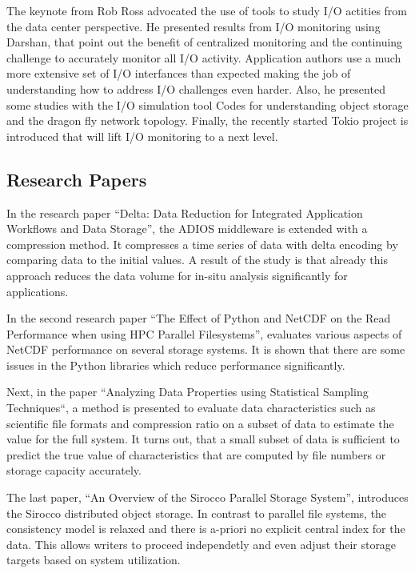 \documentclass{llncs}
\begin{document}
The keynote from Rob Ross advocated the use of tools to study I/O actities from the data center perspective.
He presented results from I/O monitoring using Darshan, that point out the benefit of centralized monitoring and the continuing challenge to accurately monitor all I/O activity. Application authors use a much more extensive set of I/O interfances than expected making the job of understanding how to address I/O challenges even harder.
Also, he presented some studies with the I/O simulation tool Codes for understanding object storage and the dragon fly network topology.
Finally, the recently started Tokio project is introduced that will lift I/O monitoring to a next level.

\subsection{Research Papers}

In the research paper “Delta: Data Reduction for Integrated Application Workflows and Data Storage”, the ADIOS middleware is extended with a compression method.
It compresses a time series of data with delta encoding by comparing data to the initial values.
A result of the study is that already this approach reduces the data volume for in-situ analysis significantly for applications.

In the second research paper “The Effect of Python and NetCDF on the Read Performance when using HPC Parallel Filesystems”, evaluates various aspects of NetCDF performance on several storage systems.
It is shown that there are some issues in the Python libraries which reduce performance significantly.

Next, in the paper “Analyzing Data Properties using Statistical Sampling Techniques“, a method is presented to evaluate data characteristics such as scientific file formats and compression ratio on a subset of data to estimate the value for the full system.
It turns out, that a small subset of data is sufficient to predict the true value of characteristics that are computed by file numbers or storage capacity accurately.

The last paper, “An Overview of the Sirocco Parallel Storage System”, introduces the Sirocco distributed object storage.
In contrast to parallel file systems, the consistency model is relaxed and there is a-priori no explicit central index for the data. This allows writers to proceed independetly and even adjust their storage targets based on system utilization.
\end{document}
